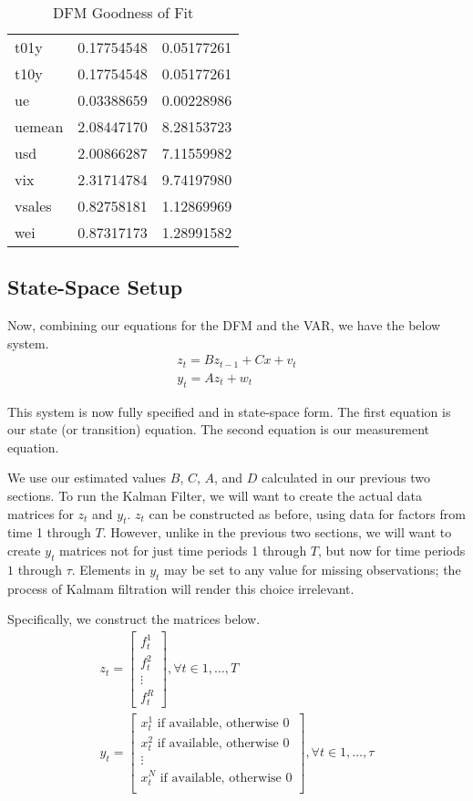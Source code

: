 \documentclass[11pt, letterpaper]{article}\usepackage[]{graphicx}\usepackage[]{color}
\begin{document}
\begin{table}[H]
\begin{tabular}{lrr}
  t01y & 0.17754548 & 0.05177261 \\ 
  t10y & 0.17754548 & 0.05177261 \\ 
  ue & 0.03388659 & 0.00228986 \\ 
  uemean & 2.08447170 & 8.28153723 \\ 
  usd & 2.00866287 & 7.11559982 \\ 
  vix & 2.31714784 & 9.74197980 \\ 
  vsales & 0.82758181 & 1.12869969 \\ 
  wei & 0.87317173 & 1.28991582 \\ 
   \hline
\end{tabular}
\endgroup
\caption{DFM Goodness of Fit} 
\end{table}





\subsection{State-Space Setup}
Now, combining our equations for the DFM and the VAR, we have the below system.
\begin{align*}
z_t = B z_{t-1} + Cx + v_t\\
y_t = A z_t + w_t
\end{align*}

This system is now fully specified and in state-space form. The first equation is our state (or transition) equation. The second equation is our measurement equation. 

We use our estimated values $B$, $C$, $A$, and $D$ calculated in our previous two sections. To run the Kalman Filter, we will want to create the actual data matrices for $z_t$ and $y_t$. $z_t$ can be constructed as before, using data for factors from time 1 through $T$. However, unlike in the previous two sections, we will want to create $y_t$ matrices not for just time periods 1 through $T$, but now for time periods $1$ through $\tau$. Elements in $y_t$ may be set to any value for missing observations; the process of Kalmam filtration will render this choice irrelevant.

Specifically, we construct the matrices below.
\begin{align*}
z_t
=
\begin{bmatrix}
	f^1_{t}\\
	f^2_{t}\\
	\vdots \\
	f^R_{t}
\end{bmatrix}, \forall t \in 1, \dots, T\\
y_t
=
\begin{bmatrix}
	\text{$x^1_{t}$ if available, otherwise 0}\\
	\text{$x^2_{t}$ if available, otherwise 0}\\
	\vdots \\
	\text{$x^N_{t}$ if available, otherwise 0}\\
\end{bmatrix}, \forall t \in 1, \dots, \tau
\end{align*}
\end{document}
